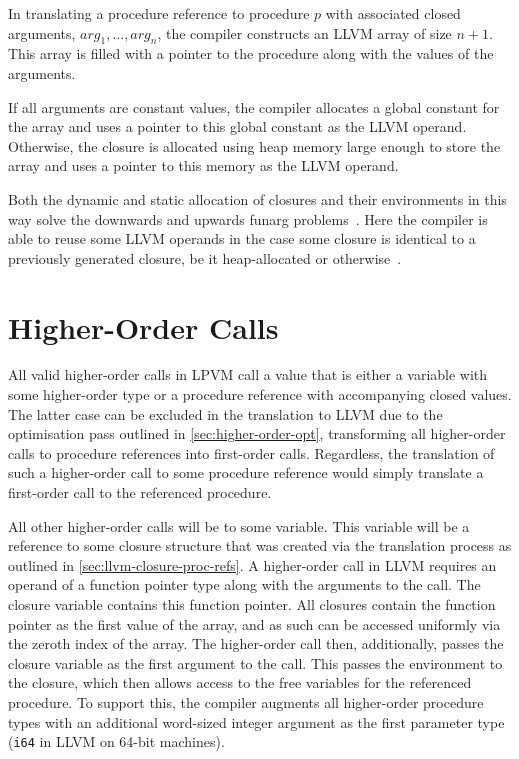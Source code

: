 In translating a procedure reference to procedure $p$ with associated closed arguments, $arg_1, \dots, arg_n$, the compiler constructs an LLVM array of size $n + 1$. This array is filled with a pointer to the procedure along with the values of the arguments. 

If all arguments are constant values, the compiler allocates a global constant for the array and uses a pointer to this global constant as the LLVM operand. Otherwise, the closure is allocated using heap memory large enough to store the array and uses a pointer to this memory as the LLVM operand.

Both the dynamic and static allocation of closures and their environments in this way solve the downwards and upwards funarg problems~\cite{moses1970function,sandwell1971proposed}. Here the compiler is able to reuse some LLVM operands in the case some closure is identical to a previously generated closure, be it heap-allocated or otherwise~\cite{keep2012optimizing}.

\section{Higher-Order Calls}
\label{sec:llvm-higher-calls}

All valid higher-order calls in LPVM call a value that is either a variable with some higher-order type or a procedure reference with accompanying closed values. The latter case can be excluded in the translation to LLVM due to the optimisation pass outlined in \cref{sec:higher-order-opt}, transforming all higher-order calls to procedure references into first-order calls. Regardless, the translation of such a higher-order call to some procedure reference would simply translate a first-order call to the referenced procedure.

All other higher-order calls will be to some variable. This variable will be a reference to some closure structure that was created via the translation process as outlined in \cref{sec:llvm-closure-proc-refs}. A higher-order call in LLVM requires an operand of a function pointer type along with the arguments to the call. The closure variable contains this function pointer. All closures contain the function pointer as the first value of the array, and as such can be accessed uniformly via the zeroth index of the array. The higher-order call then, additionally, passes the closure variable as the first argument to the call. This passes the environment to the closure, which then allows access to the free variables for the referenced procedure. To support this, the compiler augments all higher-order procedure types with an additional word-sized integer argument as the first parameter type (\texttt{i64} in LLVM on 64-bit machines).

